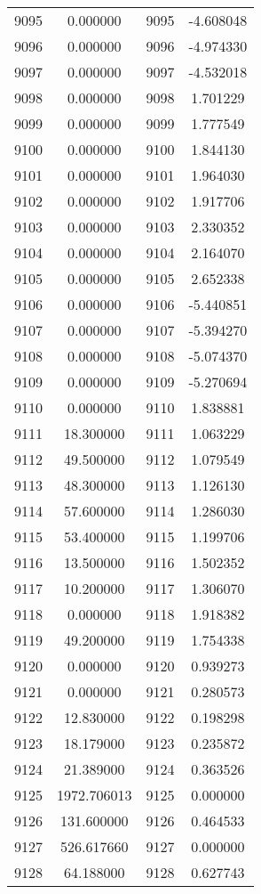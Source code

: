 \documentclass[12pt]{article}
\begin{document}
\begin{longtable}{@{}cccc@{}}
9095 & 0.000000 & 9095 & -4.608048 \\
9096 & 0.000000 & 9096 & -4.974330 \\
9097 & 0.000000 & 9097 & -4.532018 \\
9098 & 0.000000 & 9098 & 1.701229 \\
9099 & 0.000000 & 9099 & 1.777549 \\
9100 & 0.000000 & 9100 & 1.844130 \\
9101 & 0.000000 & 9101 & 1.964030 \\
9102 & 0.000000 & 9102 & 1.917706 \\
9103 & 0.000000 & 9103 & 2.330352 \\
9104 & 0.000000 & 9104 & 2.164070 \\
9105 & 0.000000 & 9105 & 2.652338 \\
9106 & 0.000000 & 9106 & -5.440851 \\
9107 & 0.000000 & 9107 & -5.394270 \\
9108 & 0.000000 & 9108 & -5.074370 \\
9109 & 0.000000 & 9109 & -5.270694 \\
9110 & 0.000000 & 9110 & 1.838881 \\
9111 & 18.300000 & 9111 & 1.063229 \\
9112 & 49.500000 & 9112 & 1.079549 \\
9113 & 48.300000 & 9113 & 1.126130 \\
9114 & 57.600000 & 9114 & 1.286030 \\
9115 & 53.400000 & 9115 & 1.199706 \\
9116 & 13.500000 & 9116 & 1.502352 \\
9117 & 10.200000 & 9117 & 1.306070 \\
9118 & 0.000000 & 9118 & 1.918382 \\
9119 & 49.200000 & 9119 & 1.754338 \\
9120 & 0.000000 & 9120 & 0.939273 \\
9121 & 0.000000 & 9121 & 0.280573 \\
9122 & 12.830000 & 9122 & 0.198298 \\
9123 & 18.179000 & 9123 & 0.235872 \\
9124 & 21.389000 & 9124 & 0.363526 \\
9125 & 1972.706013 & 9125 & 0.000000 \\
9126 & 131.600000 & 9126 & 0.464533 \\
9127 & 526.617660 & 9127 & 0.000000 \\
9128 & 64.188000 & 9128 & 0.627743 \\

\end{longtable}
\end{document}
